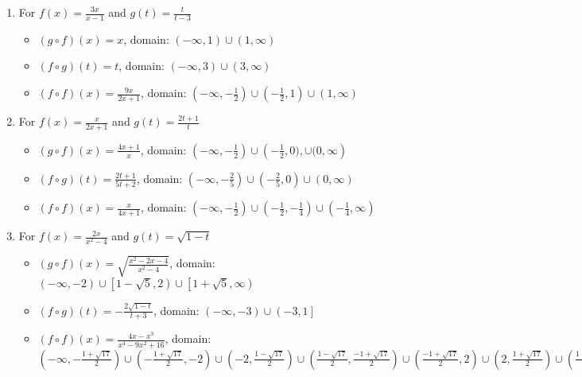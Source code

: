 \documentclass{ximera}
\begin{document}
\begin{enumerate}
\begin{itemize}
\end{itemize}


\item For   $f(x) = \frac{3x}{x-1}$ and $g(t) =\frac{t}{t-3}$

\begin{itemize}

\item  $(g \circ f)(x) =x$, domain: $\left(-\infty, 1\right) \cup (1, \infty)$

\item  $(f \circ g)(t) =t$, domain:  $\left(-\infty, 3\right) \cup (3,\infty)$

\item  $(f \circ f)(x) = \frac{9x}{2x+1}$, domain: $\left(-\infty, -\frac{1}{2}\right) \cup \left(-\frac{1}{2}, 1 \right) \cup \left(1,\infty \right)$

\end{itemize}


\item For    $f(x) = \frac{x}{2x+1}$ and $g(t) = \frac{2t+1}{t}$

\begin{itemize}

\item  $(g \circ f)(x) = \frac{4x+1}{x}$, domain: $\left(-\infty, -\frac{1}{2}\right) \cup \left(-\frac{1}{2}, 0), \cup (0, \infty\right)$

\item  $(f \circ g)(t) = \frac{2t+1}{5t+2}$, domain:  $\left(-\infty, -\frac{2}{5}\right) \cup \left(-\frac{2}{5}, 0\right) \cup (0,\infty)$

\item  $(f \circ f)(x) = \frac{x}{4x+1}$, domain: $\left(-\infty, -\frac{1}{2}\right) \cup \left(-\frac{1}{2}, -\frac{1}{4} \right) \cup \left(-\frac{1}{4},\infty\right)$

\end{itemize}


\item For  $f(x) = \frac{2x}{x^2-4}$ and $g(t) =\sqrt{1-t}$ 

\begin{itemize}

\item  $(g \circ f)(x) =\sqrt{\frac{x^2-2x-4}{x^2-4}}$, domain: $\left(-\infty, -2\right) \cup \left[1-\sqrt{5}, 2\right) \cup \left[1+\sqrt{5}, \infty\right)$

\item  $(f \circ g)(t) = -\frac{2\sqrt{1-t}}{t+3}$, domain: $\left(-\infty, -3\right) \cup \left(-3, 1\right]$

\item  $(f \circ f)(x) = \frac{4x-x^3}{x^4-9x^2+16}$, domain: $\left(-\infty, -\frac{1+\sqrt{17}}{2}\right) \cup \left(-\frac{1+\sqrt{17}}{2}, -2\right) \cup \left(-2, \frac{1-\sqrt{17}}{2}\right) \cup \left(\frac{1-\sqrt{17}}{2}, \frac{-1+\sqrt{17}}{2}\right) \cup \left(\frac{-1+\sqrt{17}}{2}, 2\right) \cup \left(2, \frac{1+\sqrt{17}}{2} \right) \cup \left(\frac{1+\sqrt{17}}{2}, \infty\right)$

\end{itemize}
\setcounter{HW}{\value{enumi}}
\end{enumerate}
\end{document}
